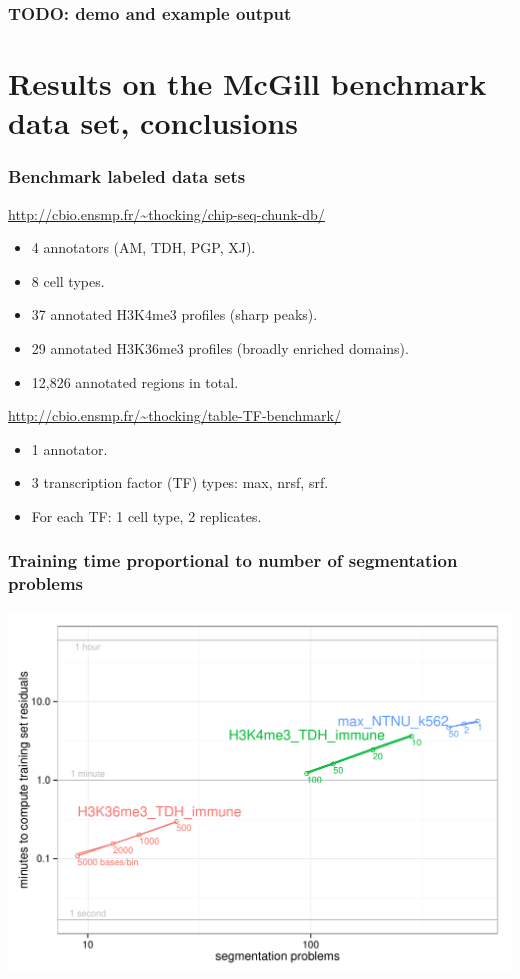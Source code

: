 \documentclass{beamer}
\begin{document}
\begin{frame}
  \frametitle{TODO: demo and example output}
  
\end{frame}

\section{Results on the McGill benchmark data set, conclusions}

\begin{frame}
  \frametitle{Benchmark labeled data sets}
  \url{http://cbio.ensmp.fr/~thocking/chip-seq-chunk-db/}
  \begin{itemize}
  \item 4 annotators (AM, TDH, PGP, XJ).
  \item 8 cell types.
  \item 37 annotated H3K4me3 profiles (sharp peaks).
  \item 29 annotated H3K36me3 profiles (broadly enriched domains).
  \item 12,826 annotated regions in total.
  \end{itemize}

  \url{http://cbio.ensmp.fr/~thocking/table-TF-benchmark/}
  \begin{itemize}
  \item 1 annotator.
  \item 3 transcription factor (TF) types: max, nrsf, srf.
  \item For each TF: 1 cell type, 2 replicates.
  \end{itemize}
\end{frame}

\begin{frame}
  \frametitle{Training time proportional to 
    number of segmentation problems}
  \includegraphics[width=\textwidth]{figure-overlapping-feasible-timings}
\end{frame}
\end{document}
